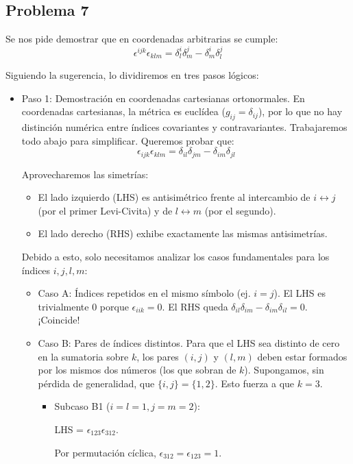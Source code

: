 \documentclass[11pt,spanish]{article}
\begin{document}
\subsection*{Problema 7}

Se nos pide demostrar que en coordenadas arbitrarias se cumple:
$$\epsilon^{ijk}\epsilon_{klm} = \delta^i_l\delta^j_m - \delta^i_m\delta^j_l$$

Siguiendo la sugerencia, lo dividiremos en tres pasos lógicos:

\begin{itemize}
\item Paso 1: Demostración en coordenadas cartesianas ortonormales.
En coordenadas cartesianas, la métrica es euclídea ($g_{ij} = \delta_{ij}$), por lo que no hay distinción numérica entre índices covariantes y contravariantes. Trabajaremos todo abajo para simplificar. Queremos probar que:
$$\epsilon_{ijk}\epsilon_{klm} = \delta_{il}\delta_{jm} - \delta_{im}\delta_{jl}$$

Aprovecharemos las simetrías:
\begin{itemize}
\item El lado izquierdo (LHS) es antisimétrico frente al intercambio de $i \leftrightarrow j$ (por el primer Levi-Civita) y de $l \leftrightarrow m$ (por el segundo).
\item El lado derecho (RHS) exhibe exactamente las mismas antisimetrías.
\end{itemize}

Debido a esto, solo necesitamos analizar los casos fundamentales para los índices $i, j, l, m$:
\begin{itemize}
\item Caso A: Índices repetidos en el mismo símbolo (ej. $i = j$).
    El LHS es trivialmente 0 porque $\epsilon_{iik} = 0$. 
    El RHS queda $\delta_{il}\delta_{im} - \delta_{im}\delta_{il} = 0$. ¡Coincide!
\item Caso B: Pares de índices distintos. Para que el LHS sea distinto de cero en la sumatoria sobre $k$, los pares $(i,j)$ y $(l,m)$ deben estar formados por los mismos dos números (los que sobran de $k$). Supongamos, sin pérdida de generalidad, que $\{i,j\} = \{1,2\}$. Esto fuerza a que $k=3$.
\begin{itemize}
\item Subcaso B1 ($i=l=1, j=m=2$): 

LHS = $\epsilon_{123}\epsilon_{312}$. 

Por permutación cíclica, $\epsilon_{312} = \epsilon_{123} = 1$. 


\end{itemize}
\end{itemize}
\end{itemize}
\end{document}
